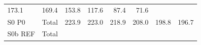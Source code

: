 \documentclass[]{article}
\begin{document}
\begin{longtable}[]{@{}llrrrrrr@{}}
\begin{minipage}[t]{0.09\columnwidth}
173.1\strut
\end{minipage} & \begin{minipage}[t]{0.09\columnwidth}\raggedleft\strut
169.4\strut
\end{minipage} & \begin{minipage}[t]{0.09\columnwidth}\raggedleft\strut
153.8\strut
\end{minipage} & \begin{minipage}[t]{0.09\columnwidth}\raggedleft\strut
117.6\strut
\end{minipage} & \begin{minipage}[t]{0.09\columnwidth}\raggedleft\strut
87.4\strut
\end{minipage} & \begin{minipage}[t]{0.09\columnwidth}\raggedleft\strut
71.6\strut
\end{minipage}\tabularnewline
\begin{minipage}[t]{0.14\columnwidth}\raggedright\strut
S0 P0\strut
\end{minipage} & \begin{minipage}[t]{0.13\columnwidth}\raggedright\strut
Total\strut
\end{minipage} & \begin{minipage}[t]{0.09\columnwidth}\raggedleft\strut
223.9\strut
\end{minipage} & \begin{minipage}[t]{0.09\columnwidth}\raggedleft\strut
223.0\strut
\end{minipage} & \begin{minipage}[t]{0.09\columnwidth}\raggedleft\strut
218.9\strut
\end{minipage} & \begin{minipage}[t]{0.09\columnwidth}\raggedleft\strut
208.0\strut
\end{minipage} & \begin{minipage}[t]{0.09\columnwidth}\raggedleft\strut
198.8\strut
\end{minipage} & \begin{minipage}[t]{0.09\columnwidth}\raggedleft\strut
196.7\strut
\end{minipage}\tabularnewline
\begin{minipage}[t]{0.14\columnwidth}\raggedright\strut
S0b REF\strut
\end{minipage} & \begin{minipage}[t]{0.13\columnwidth}\raggedright\strut
Total\strut
\end{minipage} & \begin{minipage}[t]{0.09\columnwidth}\raggedleft\strut

\end{minipage}
\end{longtable}
\end{document}
